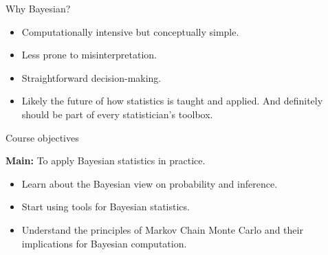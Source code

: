 

\begin{frame}{Why Bayesian?}

\begin{itemize}\itemsep1.2em

\item Computationally intensive but conceptually simple.

\item Less prone to misinterpretation.

\item Straightforward decision-making.

\item Likely the future of how statistics is taught and applied. And definitely should be part of every statistician's toolbox.

\end{itemize}
\end{frame}


\begin{frame}{Course objectives}

\begin{LARGE}
\textbf{Main:} To apply Bayesian statistics in practice.
\end{LARGE}

\bigskip

\begin{itemize}\itemsep1.2em

\item Learn about the Bayesian view on probability and inference.

\item Start using tools for Bayesian statistics.

\item Understand the principles of Markov Chain Monte Carlo and their implications for Bayesian computation.

\end{itemize}

\bigskip

\end{frame}


